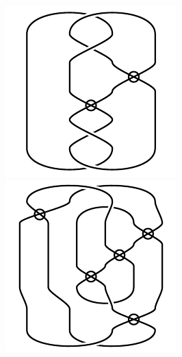 \begin{figure}[H]
\begin{minipage}[b]{.18\linewidth}
\end{minipage}
\begin{minipage}[b]{.18\linewidth}
\centering
\includegraphics[width=\linewidth]{../data/virtual_4_94.png}
\end{minipage}
\begin{minipage}[b]{.18\linewidth}
\centering
\includegraphics[width=\linewidth]{../data/virtual_4_95.png}

\end{minipage}
\end{figure}
